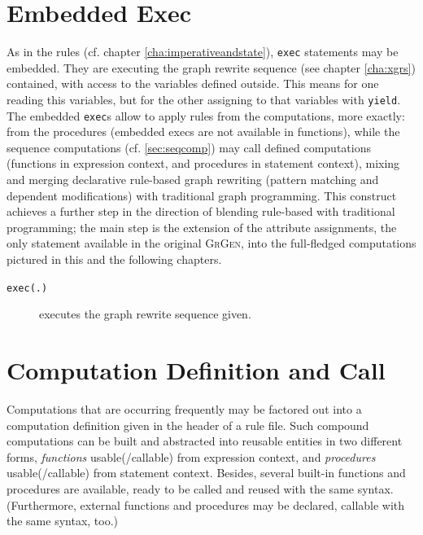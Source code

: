 \section{Embedded Exec} 

As in the rules (cf. chapter \ref{cha:imperativeandstate}), \texttt{exec} statements may be embedded.
They are executing the graph rewrite sequence (see chapter \ref{cha:xgrs}) contained, with access to the variables defined outside.
This means for one reading this variables, but for the other assigning to that variables with \texttt{yield}.
The embedded \texttt{exec}s allow to apply rules from the computations, more exactly: from the procedures (embedded execs are not available in functions), while the sequence computations (cf. \ref{sec:seqcomp}) may call defined computations (functions in expression context, and procedures in statement context), mixing and merging declarative rule-based graph rewriting (pattern matching and dependent modifications) with traditional graph programming.
This construct achieves a further step in the direction of blending rule-based with traditional programming; the main step is the extension of the attribute assignments, the only statement available in the original {\scshape GrGen}, into the full-fledged computations pictured in this and the following chapters.

\begin{description}
\item[\texttt{exec(.)}] executes the graph rewrite sequence given. 
\end{description}



\section{Computation Definition and Call} \label{sub:compdef}

Computations that are occurring frequently may be factored out into a computation definition given in the header of a rule file.
Such compound computations can be built and abstracted into reusable entities in two different forms, \emph{functions} usable(/callable) from expression context, and \emph{procedures} usable(/callable) from statement context.
Besides, several built-in functions and procedures are available, ready to be called and reused with the same syntax.
(Furthermore, external functions and procedures may be declared, callable with the same syntax, too.)

